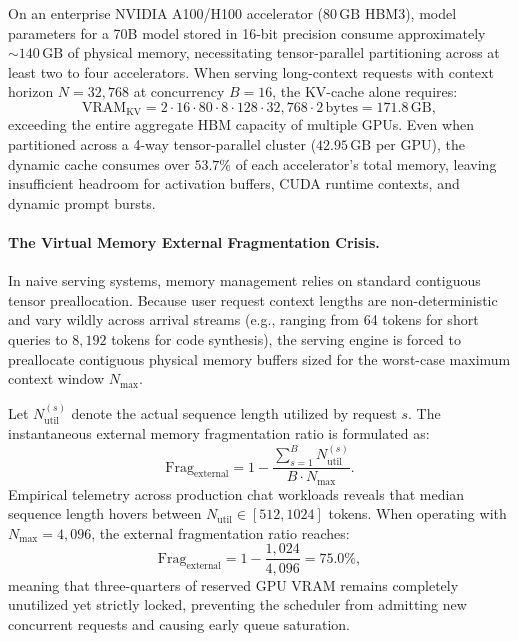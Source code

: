 On an enterprise NVIDIA A100/H100 accelerator ($80\,\text{GB}$ HBM3), model parameters for a 70B model stored in 16-bit precision consume approximately $\sim 140\,\text{GB}$ of physical memory, necessitating tensor-parallel partitioning across at least two to four accelerators. When serving long-context requests with context horizon $N = 32{,}768$ at concurrency $B=16$, the KV-cache alone requires:
\begin{equation}
\text{VRAM}_{\text{KV}} = 2 \cdot 16 \cdot 80 \cdot 8 \cdot 128 \cdot 32{,}768 \cdot 2\,\text{bytes} = 171.8\,\text{GB},
\end{equation}
exceeding the entire aggregate HBM capacity of multiple GPUs. Even when partitioned across a 4-way tensor-parallel cluster ($42.95\,\text{GB}$ per GPU), the dynamic cache consumes over $53.7\%$ of each accelerator's total memory, leaving insufficient headroom for activation buffers, CUDA runtime contexts, and dynamic prompt bursts.

\paragraph{The Virtual Memory External Fragmentation Crisis.}
In naive serving systems, memory management relies on standard contiguous tensor preallocation. Because user request context lengths are non-deterministic and vary wildly across arrival streams (e.g., ranging from 64 tokens for short queries to $8{,}192$ tokens for code synthesis), the serving engine is forced to preallocate contiguous physical memory buffers sized for the worst-case maximum context window $N_{\max}$. 

Let $N_{\text{util}}^{(s)}$ denote the actual sequence length utilized by request $s$. The instantaneous external memory fragmentation ratio is formulated as:
\begin{equation}
\text{Frag}_{\text{external}} = 1 - \frac{\sum_{s=1}^B N_{\text{util}}^{(s)}}{B \cdot N_{\max}}.
\end{equation}
Empirical telemetry across production chat workloads reveals that median sequence length hovers between $N_{\text{util}} \in [512, 1024]$ tokens. When operating with $N_{\max} = 4{,}096$, the external fragmentation ratio reaches:
\begin{equation}
\text{Frag}_{\text{external}} = 1 - \frac{1{,}024}{4{,}096} = 75.0\%,
\end{equation}
meaning that three-quarters of reserved GPU VRAM remains completely unutilized yet strictly locked, preventing the scheduler from admitting new concurrent requests and causing early queue saturation.

